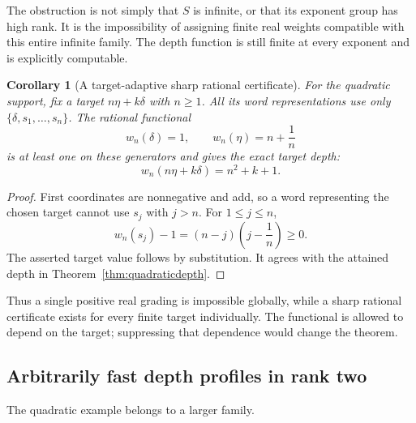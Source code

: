 \documentclass[11pt,a4paper]{article}
\newtheorem{corollary}[theorem]{Corollary}
\theoremstyle{definition}
\theoremstyle{remark}
\begin{document}
The obstruction is not simply that $S$ is infinite, or that its exponent
group has high rank. It is the impossibility of assigning finite real
weights compatible with this entire infinite family. The depth function
is still finite at every exponent and is explicitly computable.


\begin{corollary}[A target-adaptive sharp rational certificate]
\label{cor:adaptive}
For the quadratic support, fix a target $n\eta+k\delta$ with $n\ge1$.
All its word representations use only
$\{\delta,s_1,\ldots,s_n\}$. The rational functional
\[
 w_n(\delta)=1,\qquad w_n(\eta)=n+\frac1n
\]
is at least one on these generators and gives the exact target depth:
\[
 w_n(n\eta+k\delta)=n^2+k+1.
\]
\end{corollary}
\begin{proof}
First coordinates are nonnegative and add, so a word representing the
chosen target cannot use $s_j$ with $j>n$. For $1\le j\le n$,
\[
 w_n(s_j)-1=(n-j)\left(j-\frac1n\right)\ge0.
\]
The asserted target value follows by substitution. It agrees with the
attained depth in Theorem~\ref{thm:quadraticdepth}.
\end{proof}

Thus a single positive real grading is impossible globally, while a sharp
rational certificate exists for every finite target individually. The
functional is allowed to depend on the target; suppressing that dependence
would change the theorem.

\subsection{Arbitrarily fast depth profiles in rank two}
The quadratic example belongs to a larger family.
\end{document}
